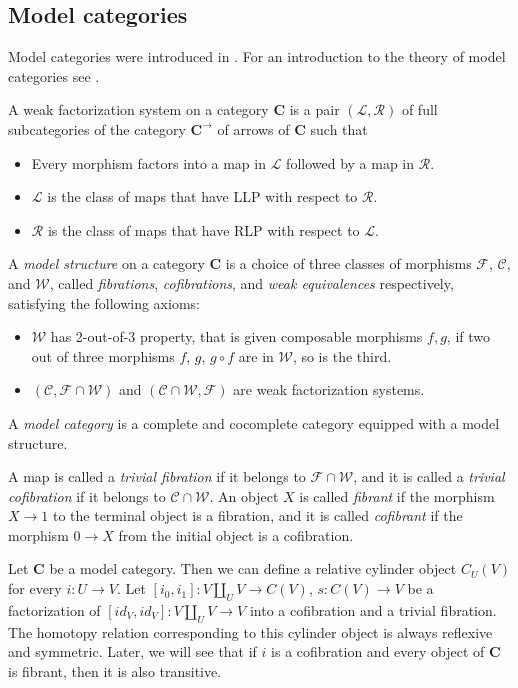 \documentclass{amsart}
\theoremstyle{definition}
\newcommand{\we}{\mathcal{W}}
\newcommand{\fib}{\mathcal{F}}
\newcommand{\cof}{\mathcal{C}}
\newcommand{\cat}[1]{\mathbf{#1}}
\newcommand{\C}{\cat{C}}
\newcommand{\cyli}{i}
\begin{document}
\subsection{Model categories}

Model categories were introduced in \cite{quillen}.
For an introduction to the theory of model categories see \cite{hirschhorn,hovey}.

\begin{defn} A weak factorization system on a category $\C$ is a pair $(\mathcal{L},\mathcal{R})$
of full subcategories of the category $\C^\to$ of arrows of $\C$ such that
\begin{itemize}
\item Every morphism factors into a map in $\mathcal{L}$ followed by a map in $\mathcal{R}$.
\item $\mathcal{L}$ is the class of maps that have LLP with respect to $\mathcal{R}$.
\item $\mathcal{R}$ is the class of maps that have RLP with respect to $\mathcal{L}$.
\end{itemize}
\end{defn}

\begin{defn}
A \emph{model structure} on a category $\C$ is a choice of three classes of morphisms $\fib$, $\cof$, and $\we$,
called \emph{fibrations}, \emph{cofibrations}, and \emph{weak equivalences} respectively, satisfying the following axioms:
\begin{itemize}
\item $\we$ has 2-out-of-3 property, that is given composable morphisms $f,g$,
    if two out of three morphisms $f$, $g$, $g \circ f$ are in $\we$, so is the third.
\item $(\cof, \fib \cap \we)$ and $(\cof \cap \we, \fib)$ are weak factorization systems.
\end{itemize}
A \emph{model category} is a complete and cocomplete category equipped with a model structure.
\end{defn}

A map is called a \emph{trivial fibration} if it belongs to $\fib \cap \we$,
and it is called a \emph{trivial cofibration} if it belongs to $\cof \cap \we$.
An object $X$ is called \emph{fibrant} if the morphism $X \to 1$ to the terminal object is a fibration,
and it is called \emph{cofibrant} if the morphism $0 \to X$ from the initial object is a cofibration.

Let $\C$ be a model category.
Then we can define a relative cylinder object $C_U(V)$ for every $i : U \to V$.
Let $[\cyli_0,\cyli_1] : V \amalg_U V \to C(V)$, $s : C(V) \to V$ be a factorization of $[id_V,id_V] : V \amalg_U V \to V$ into a cofibration and a trivial fibration.
The homotopy relation corresponding to this cylinder object is always reflexive and symmetric.
Later, we will see that if $i$ is a cofibration and every object of $\C$ is fibrant, then it is also transitive.
\end{document}
